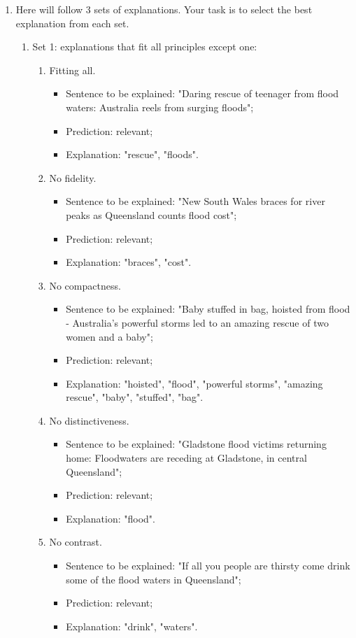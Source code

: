 \begin{enumerate}
    \item Here will follow 3 sets of explanations. Your task is to select the best explanation from each set. \begin{enumerate}
        \item Set 1: explanations that fit all principles except one: \begin{enumerate}
            \item Fitting all. \begin{itemize}
                \item Sentence to be explained: "Daring rescue of teenager from flood waters: Australia reels from surging floods";
                \item Prediction: relevant;
                \item Explanation: "rescue", "floods".
            \end{itemize}
            \item No fidelity. \begin{itemize}
                \item Sentence to be explained: "New South Wales braces for river peaks as Queensland counts flood cost";
                \item Prediction: relevant;
                \item Explanation: "braces", "cost".
            \end{itemize}
            \item No compactness. \begin{itemize}
                \item Sentence to be explained: "Baby stuffed in bag, hoisted from flood - Australia's powerful storms led to an amazing rescue of two women and a baby";
                \item Prediction: relevant;
                \item Explanation: "hoisted", "flood", "powerful storms", "amazing rescue", "baby", "stuffed", "bag".
            \end{itemize}
            \item No distinctiveness. \begin{itemize}
                \item Sentence to be explained: "Gladstone flood victims returning home: Floodwaters are receding at Gladstone, in central Queensland";
                \item Prediction: relevant;
                \item Explanation: "flood".
            \end{itemize}
            \item No contrast. \begin{itemize}
                \item Sentence to be explained: "If all you people are thirsty come drink some of the flood waters in Queensland";
                \item Prediction: relevant;
                \item Explanation: "drink", "waters".
            \end{itemize}
        \end{enumerate}
        

\end{enumerate}
\end{enumerate}
